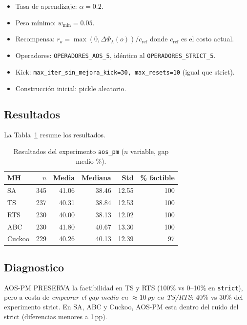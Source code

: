 \documentclass[11pt,a4paper]{article}
\theoremstyle{definition}
\theoremstyle{remark}
\begin{document}
\begin{itemize}
\item Tasa de aprendizaje: $\alpha = 0.2$.
\item Peso mínimo: $w_{\min} = 0.05$.
\item Recompensa: $r_o = \max(0, \Delta\Phi_\lambda(o)) / c_{\text{ref}}$
  donde $c_{\text{ref}}$ es el costo actual.
\item Operadores: \texttt{OPERADORES\_AOS\_5}, idéntico al
  \texttt{OPERADORES\_STRICT\_5}.
\item Kick: \texttt{max\_iter\_sin\_mejora\_kick=30, max\_resets=10}
  (igual que strict).
\item Construcción inicial: pickle aleatorio.
\end{itemize}

\subsection{Resultados}

La Tabla~\ref{tab:aos-resultados} resume los resultados.

\begin{table}[h]
\centering
\caption{Resultados del experimento \texttt{aos\_pm} ($n$ variable, gap medio \%).}
\label{tab:aos-resultados}
\small
\begin{tabular}{lrrrrr}
\toprule
MH & $n$ & Media & Mediana & Std & \% factible \\
\midrule
SA      & 345 & 41.06 & 38.46 & 12.55 & 100 \\
TS      & 237 & 40.31 & 38.84 & 12.53 & 100 \\
RTS     & 230 & 40.00 & 38.13 & 12.02 & 100 \\
ABC     & 230 & 41.80 & 40.67 & 13.30 & 100 \\
Cuckoo  & 229 & 40.26 & 40.13 & 12.39 & 97 \\
\bottomrule
\end{tabular}
\end{table}

\subsection{Diagnostico}

AOS-PM PRESERVA la factibilidad en TS y RTS (100\% vs 0--10\% en
\texttt{strict}), pero a costa de \emph{empeorar el gap medio en
$\approx 10$\,pp en TS/RTS}: 40\% vs 30\% del experimento strict. En
SA, ABC y Cuckoo, AOS-PM esta dentro del ruido del strict (diferencias
menores a 1\,pp).
\end{document}

